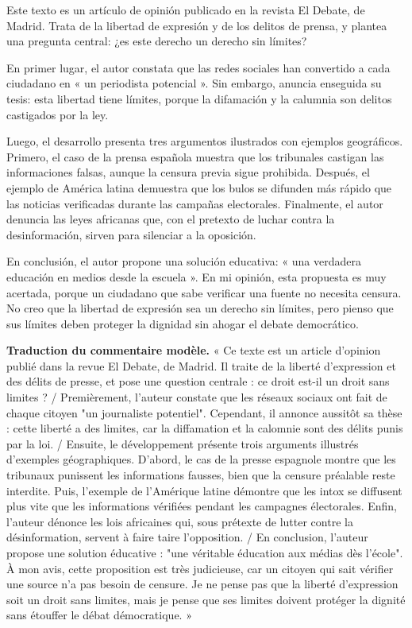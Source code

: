 \documentclass[11pt]{article}
\newcounter{popsec}
\newcounter{popsub}
\newcommand{\courssub}[1]{%
  \stepcounter{popsub}%
  \par\vspace{9pt}\noindent{\popxbold\fontsize{11.5}{13}\selectfont\color{popink}{\color{poporange}\thepopsec.\thepopsub}\hspace{6pt}#1}\par\nopagebreak\vspace{4pt}
}
\begin{document}
\courssub{Commentaire modèle (rédigé en espagnol)}

\begin{textebox}
Este texto es un artículo de opinión publicado en la revista El Debate, de Madrid. Trata de la libertad de expresión y de los delitos de prensa, y plantea una pregunta central: ¿es este derecho un derecho sin límites?

En primer lugar, el autor constata que las redes sociales han convertido a cada ciudadano en « un periodista potencial ». Sin embargo, anuncia enseguida su tesis: esta libertad tiene límites, porque la difamación y la calumnia son delitos castigados por la ley.

Luego, el desarrollo presenta tres argumentos ilustrados con ejemplos geográficos. Primero, el caso de la prensa española muestra que los tribunales castigan las informaciones falsas, aunque la censura previa sigue prohibida. Después, el ejemplo de América latina demuestra que los bulos se difunden más rápido que las noticias verificadas durante las campañas electorales. Finalmente, el autor denuncia las leyes africanas que, con el pretexto de luchar contra la desinformación, sirven para silenciar a la oposición.

En conclusión, el autor propone una solución educativa: « una verdadera educación en medios desde la escuela ». En mi opinión, esta propuesta es muy acertada, porque un ciudadano que sabe verificar una fuente no necesita censura. No creo que la libertad de expresión sea un derecho sin límites, pero pienso que sus límites deben proteger la dignidad sin ahogar el debate democrático.
\end{textebox}

\textbf{Traduction du commentaire modèle.} « Ce texte est un article d'opinion publié dans la revue El Debate, de Madrid. Il traite de la liberté d'expression et des délits de presse, et pose une question centrale : ce droit est-il un droit sans limites ? / Premièrement, l'auteur constate que les réseaux sociaux ont fait de chaque citoyen "un journaliste potentiel". Cependant, il annonce aussitôt sa thèse : cette liberté a des limites, car la diffamation et la calomnie sont des délits punis par la loi. / Ensuite, le développement présente trois arguments illustrés d'exemples géographiques. D'abord, le cas de la presse espagnole montre que les tribunaux punissent les informations fausses, bien que la censure préalable reste interdite. Puis, l'exemple de l'Amérique latine démontre que les intox se diffusent plus vite que les informations vérifiées pendant les campagnes électorales. Enfin, l'auteur dénonce les lois africaines qui, sous prétexte de lutter contre la désinformation, servent à faire taire l'opposition. / En conclusion, l'auteur propose une solution éducative : "une véritable éducation aux médias dès l'école". À mon avis, cette proposition est très judicieuse, car un citoyen qui sait vérifier une source n'a pas besoin de censure. Je ne pense pas que la liberté d'expression soit un droit sans limites, mais je pense que ses limites doivent protéger la dignité sans étouffer le débat démocratique. »
\end{document}
